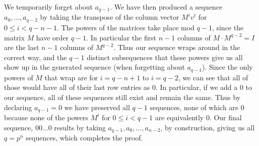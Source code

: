 \documentclass[12pt]{article}
\theoremstyle{definitionstyle}
\begin{document}
\begin{enumerate}
		We temporarily forget about $a_{q-1}$. We have then produced a sequence $a_0, \ldots, a_{q-2}$ by taking the transpose of the column vector $M^iv^t$ for $0 \leq i < q - n - 1$. The powers of the matrices take place mod $q-1$, since the matrix $M$ have order $q-1$. In particular the first $n-1$ columns of $M \cdot M^{q-2} = I$ are the last $n-1$ columns of $M^{q-2}$. Thus our sequence wraps around in the correct way, and the $q - 1$ distinct subsequences that these powers give us all show up in the generated sequence (when forgetting about $a_{q-1}$). Since the only powers of $M$ that wrap are for $i = q-n+1$ to $i=q-2$, we can see that all of those would have all of their last row entries as 0. In particular, if we add a 0 to our sequence, all of these sequences still exist and remain the same. Thus by declaring $a_{q-1} = 0$ we have preserved all $q-1$ sequences, none of which are 0 because none of the powers $M^i$ for $0 \leq i < q-1$ are equivalently 0. Our final sequence, 00$\ldots$0 results by taking $a_{q-1}, a_0, \ldots, a_{n-2}$, by construction, giving us all $q = p^n$ sequences, which completes the proof.
	\end{enumerate}
\end{document}
